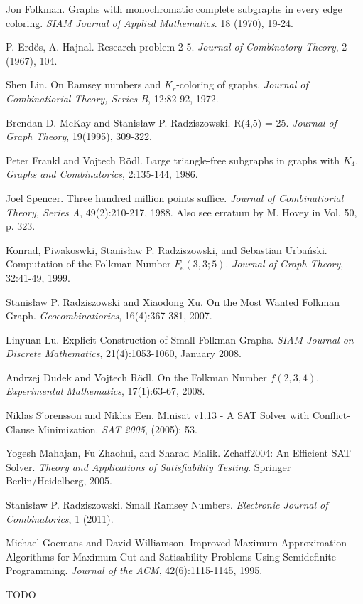 \documentclass[paper=a4, fontsize=11pt]{scrartcl} %
\begin{document}

\begin{thebibliography}{9}

 Jon Folkman. Graphs with monochromatic complete subgraphs in
every edge coloring. \emph{SIAM Journal of Applied Mathematics}. 18 (1970), 19-24.

 P. Erd\H{o}s, A. Hajnal. Research problem 2-5. \emph{Journal of Combinatory Theory}, 
2 (1967), 104.

 Shen Lin. On Ramsey numbers and $K_r$-coloring of graphs. \emph{Journal of
Combinatiorial Theory, Series B}, 12:82-92, 1972.

 Brendan D. McKay and Stanis{\l}aw P. Radziszowski. R(4,5) = 25. \emph{Journal
of Graph Theory}, 19(1995), 309-322.

 Peter Frankl and Vojtech R\"{o}dl. Large triangle-free subgraphs
in graphs with $K_4$. \emph{Graphs and Combinatorics}, 2:135-144, 1986.

 Joel Spencer. Three hundred million points suffice. \emph{Journal of
Combinatiorial Theory, Series A}, 49(2):210-217, 1988. Also see erratum by M. Hovey in
Vol. 50, p. 323.

 Konrad, Piwakoswki, Stanis{\l}aw P. Radziszowski, and Sebastian
Urba\'nski. Computation of the Folkman Number $F_e(3,3;5)$. \emph{Journal of Graph
Theory}, 32:41-49, 1999.

 Stanis{\l}aw P. Radziszowski and Xiaodong Xu. On the Most Wanted
Folkman Graph. \emph{Geocombinatiorics}, 16(4):367-381, 2007.

 Linyuan Lu. Explicit Construction of Small Folkman Graphs. \emph{SIAM Journal
on Discrete Mathematics}, 21(4):1053-1060, January 2008.

 Andrzej Dudek and Vojtech R\"{o}dl. On the Folkman Number $f(2,3,4)$.
\emph{Experimental Mathematics}, 17(1):63-67, 2008.

 Niklas S\''{o}rensson and Niklas Een. Minisat v1.13 - A SAT Solver with Conflict-Clause Minimization. \emph{SAT 2005}, (2005): 53.

 Yogesh Mahajan, Fu Zhaohui, and Sharad Malik. Zchaff2004: An Efficient SAT Solver. \emph{Theory and Applications of Satisfiability Testing}. Springer Berlin/Heidelberg, 2005.

 Stanis{\l}aw P. Radziszowski. Small Ramsey Numbers. \emph{Electronic Journal of Combinatorics}, 1 (2011).

 Michael Goemans and David Williamson. Improved Maximum Approximation Algorithms for Maximum Cut and Satisability Problems Using Semidefinite Programming. \emph{Journal of the ACM}, 42(6):1115-1145, 1995.

 TODO

\end{thebibliography}
\end{document}
